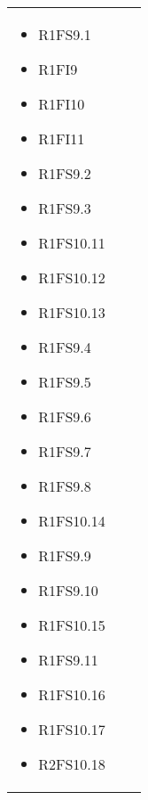 {\begin{longtable}{C{4cm} C{6cm} C{4cm}}
\begin{itemize}
    \item[ ] R1FS9.1
    \item[ ] R1FI9
    \item[ ] R1FI10
    \item[ ] R1FI11
    \item[ ] R1FS9.2
    \item[ ] R1FS9.3
    \item[ ] R1FS10.11
    \item[ ] R1FS10.12
    \item[ ] R1FS10.13
    \item[ ] R1FS9.4
    \item[ ] R1FS9.5
    \item[ ] R1FS9.6
    \item[ ] R1FS9.7
    \item[ ] R1FS9.8
    \item[ ] R1FS10.14
    \item[ ] R1FS9.9
    \item[ ] R1FS9.10
    \item[ ] R1FS10.15
    \item[ ] R1FS9.11
    \item[ ] R1FS10.16
    \item[ ] R1FS10.17
    \item[ ] R2FS10.18
\end{itemize}

\end{longtable}
}

